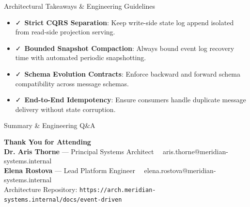 \documentclass[
  style=simple,
  size=11pt,
  paper=screen,
  orient=landscape
]{powerdot}
\begin{document}
\begin{slide}{Architectural Takeaways \& Engineering Guidelines}
\begin{itemize}
  \item \faCheck\ \textbf{Strict CQRS Separation}: Keep write-side state log append isolated from read-side projection serving.
  \item \faCheck\ \textbf{Bounded Snapshot Compaction}: Always bound event log recovery time with automated periodic snapshotting.
  \item \faCheck\ \textbf{Schema Evolution Contracts}: Enforce backward and forward schema compatibility across message schemas.
  \item \faCheck\ \textbf{End-to-End Idempotency}: Ensure consumers handle duplicate message delivery without state corruption.
\end{itemize}
\end{slide}

\begin{wideslide}{Summary \& Engineering Q\&A}
\vspace{1.0em}
\begin{tcolorbox}[monobox,title=Meridian Architecture \& Engineering Lab]
\centering
\vspace{0.5em}
\Large \textbf{Thank You for Attending}\\[0.8em]
\small
\textbf{Dr. Aris Thorne} --- Principal Systems Architect \textbar\ \faEnvelope\ aris.thorne@meridian-systems.internal\\[0.3em]
\textbf{Elena Rostova} --- Lead Platform Engineer \textbar\ \faEnvelope\ elena.rostova@meridian-systems.internal\\[1.0em]
\tiny
Architecture Repository: \texttt{https://arch.meridian-systems.internal/docs/event-driven}
\vspace{0.5em}
\end{tcolorbox}
\end{wideslide}
\end{document}
